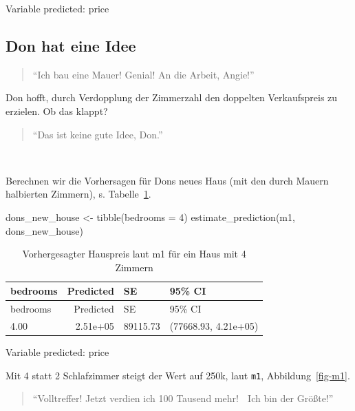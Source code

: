 \documentclass[
  a4paper,
  DIV=11]{scrreprt}
\newenvironment{Shaded}{\begin{snugshade}}{\end{snugshade}}
\newcommand{\AttributeTok}[1]{\textcolor[rgb]{0.40,0.45,0.13}{#1}}
\newcommand{\DecValTok}[1]{\textcolor[rgb]{0.68,0.00,0.00}{#1}}
\newcommand{\FunctionTok}[1]{\textcolor[rgb]{0.28,0.35,0.67}{#1}}
\newcommand{\NormalTok}[1]{\textcolor[rgb]{0.00,0.23,0.31}{#1}}
\newcommand{\OtherTok}[1]{\textcolor[rgb]{0.00,0.23,0.31}{#1}}
\theoremstyle{definition}
\theoremstyle{remark}
\begin{document}
Variable predicted: price

\hypertarget{don-hat-eine-idee}{%
\subsection{Don hat eine Idee}\label{don-hat-eine-idee}}

\begin{quote}
``Ich bau eine Mauer! Genial! An die Arbeit, Angie!'' 🧑
\end{quote}

Don hofft, durch Verdopplung der Zimmerzahl den doppelten Verkaufspreis
zu erzielen. Ob das klappt?

\begin{quote}
``Das ist keine gute Idee, Don.''
\end{quote}

👩

Berechnen wir die Vorhersagen für Dons neues Haus (mit den durch Mauern
halbierten Zimmern), s. Tabelle~\ref{tbl-m1-pred2a}.

\begin{Shaded}
\begin{Highlighting}[]
\NormalTok{dons\_new\_house }\OtherTok{\textless{}{-}} \FunctionTok{tibble}\NormalTok{(}\AttributeTok{bedrooms =} \DecValTok{4}\NormalTok{)}
\FunctionTok{estimate\_prediction}\NormalTok{(m1, dons\_new\_house)}
\end{Highlighting}
\end{Shaded}

\hypertarget{tbl-m1-pred2a}{}
\begin{longtable}[]{@{}lrll@{}}
\caption{\label{tbl-m1-pred2a}Vorhergesagter Hauspreis laut m1 für ein
Haus mit 4 Zimmern}\tabularnewline
\toprule()
bedrooms & Predicted & SE & 95\% CI \\
\midrule()
\endfirsthead
\toprule()
bedrooms & Predicted & SE & 95\% CI \\
\midrule()
\endhead
4.00 & 2.51e+05 & 89115.73 & (77668.93, 4.21e+05) \\
\bottomrule()
\end{longtable}

Variable predicted: price

Mit 4 statt 2 Schlafzimmer steigt der Wert auf 250k, laut \texttt{m1},
Abbildung~\ref{fig-m1}.

\begin{quote}
``Volltreffer! Jetzt verdien ich 100 Tausend mehr! 🤑 Ich bin der
Größte!'' 🧑
\end{quote}
\end{document}
